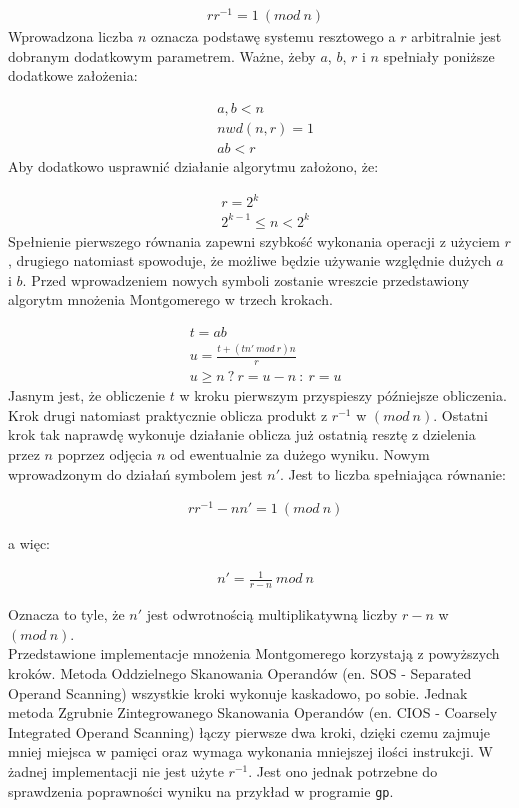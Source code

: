 \documentclass[10pt,journal,compsoc]{IEEEtran}
\begin{document}
\begin{align*}
  &rr^{-1}=1\ (mod\ n)
\end{align*}
\noindent
Wprowadzona liczba $n$ oznacza podstawę systemu resztowego a $r$ arbitralnie jest dobranym dodatkowym parametrem. Ważne, żeby $a$, $b$, $r$ i $n$ spełniały poniższe dodatkowe założenia:  

\begin{align*}
   &a, b < n  \\
   &nwd(n,r) = 1  \\
   &ab < r 
\end{align*}
\noindent
Aby dodatkowo usprawnić działanie algorytmu założono, że:

\begin{align*}
  &r = 2^k \\
  &2^{k-1} \leq n < 2^k 
\end{align*}
\noindent
Spełnienie pierwszego równania zapewni szybkość wykonania operacji z użyciem $r$, drugiego natomiast spowoduje, że możliwe będzie używanie względnie dużych $a$ i $b$. Przed wprowadzeniem nowych symboli zostanie wreszcie przedstawiony algorytm mnożenia Montgomerego w trzech krokach. 

\begin{align*}
  &t = ab\\
  &u = \frac{t+(tn'\ mod\ r)n}{r}\\
  &u \geq n\ ?\ r = u-n\ :\ r = u
\end{align*}
\noindent
Jasnym jest, że obliczenie $t$ w kroku pierwszym przyspieszy późniejsze obliczenia. Krok drugi natomiast praktycznie oblicza produkt z $r^{-1}$ w $(mod\ n)$. Ostatni krok tak naprawdę wykonuje działanie oblicza już ostatnią resztę z dzielenia przez $n$ poprzez odjęcia $n$ od ewentualnie za dużego wyniku. Nowym wprowadzonym do działań symbolem jest $n'$. Jest to liczba spełniająca równanie:

\begin{align*}
  &rr^{-1}-nn'=1\ (mod\ n)
\end{align*}

a więc:

\begin{align*}
  &n'= \frac{1}{r-n}\ mod\ n
\end{align*}

\noindent
Oznacza to tyle, że $n'$ jest odwrotnością multiplikatywną liczby $r-n$ w $(mod\ n)$. \\ \newline
Przedstawione implementacje mnożenia Montgomerego korzystają z powyższych kroków. Metoda Oddzielnego Skanowania Operandów (en. SOS - Separated Operand Scanning) wszystkie kroki wykonuje kaskadowo, po sobie. Jednak metoda Zgrubnie Zintegrowanego Skanowania Operandów (en. CIOS - Coarsely Integrated Operand Scanning) łączy pierwsze dwa kroki, dzięki czemu zajmuje mniej miejsca w pamięci oraz wymaga wykonania mniejszej ilości instrukcji. W żadnej implementacji nie jest użyte $r^{-1}$. Jest ono jednak potrzebne do sprawdzenia poprawności wyniku na przykład w programie \texttt{gp}.
\end{document}
